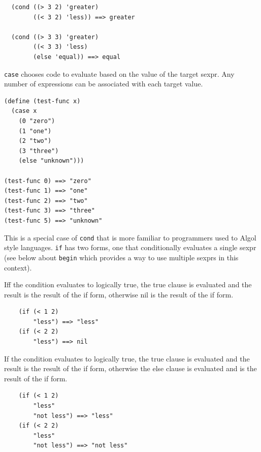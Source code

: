 \documentclass[12pt]{article}
\begin{document}
\begin{verbatim}
  (cond ((> 3 2) 'greater)
        ((< 3 2) 'less)) ==> greater

  (cond ((> 3 3) 'greater)
        ((< 3 3) 'less)
        (else 'equal)) ==> equal
\end{verbatim}


\verb|case| chooses code to evaluate based on the value of the target
sexpr. Any number of expressions can be associated with each target value.

\begin{verbatim}
(define (test-func x)
  (case x
    (0 "zero")
    (1 "one")
    (2 "two")
    (3 "three")
    (else "unknown")))

(test-func 0) ==> "zero"
(test-func 1) ==> "one"
(test-func 2) ==> "two"
(test-func 3) ==> "three"
(test-func 5) ==> "unknown"
\end{verbatim}


This is a special case of \verb|cond| that is more familiar to
programmers used to Algol style languages. \verb|if| has two forms,
one that conditionally evaluates a single sexpr (see below about
\verb|begin| which provides a way to use multiple sexprs in this context).

Iff the condition evaluates to logically true, the true clause is
evaluated and the result is the result of the if form, otherwise nil
is the result of the if form. 

\begin{verbatim}
    (if (< 1 2) 
        "less") ==> "less"
    (if (< 2 2) 
        "less") ==> nil
\end{verbatim}


If the condition evaluates to logically true, the true clause is
evaluated and the result is the result of the if form, otherwise the
else clause is evaluated and is the result of the if form. 

\begin{verbatim}
    (if (< 1 2) 
        "less" 
        "not less") ==> "less"
    (if (< 2 2) 
        "less" 
        "not less") ==> "not less"
\end{verbatim}

\end{document}

